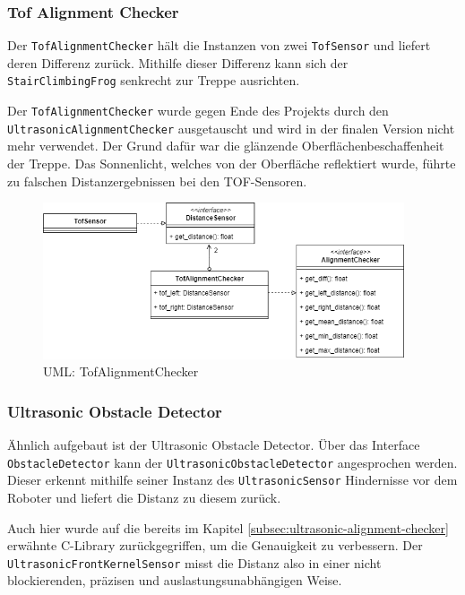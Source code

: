 \subsubsection{Tof Alignment Checker}
Der \texttt{TofAlignmentChecker} hält die Instanzen von zwei \texttt{TofSensor} und liefert deren Differenz zurück. Mithilfe dieser Differenz kann sich der \texttt{StairClimbingFrog} senkrecht zur Treppe ausrichten.

Der \texttt{TofAlignmentChecker} wurde gegen Ende des Projekts durch den \\ \texttt{UltrasonicAlignmentChecker} ausgetauscht und wird in der finalen Version nicht mehr verwendet. Der Grund dafür war die glänzende Oberflächenbeschaffenheit der Treppe. Das Sonnenlicht, welches von der Oberfläche reflektiert wurde, führte zu falschen Distanzergebnissen bei den TOF-Sensoren.

\begin{figure}[H]
  \includegraphics[width=0.95\textwidth]{img/softwarearchitektur/UML-TofAlignmentChecker.png}
  \centering
  \caption{UML: TofAlignmentChecker}
  \label{fig:uml-tof-alignment-checker}
\end{figure}

\newpage

\subsubsection{Ultrasonic Obstacle Detector}
Ähnlich aufgebaut ist der Ultrasonic Obstacle Detector. Über das Interface \texttt{ObstacleDetector} kann der \texttt{UltrasonicObstacleDetector} angesprochen werden. Dieser erkennt mithilfe seiner Instanz des \texttt{UltrasonicSensor} Hindernisse vor dem Roboter und liefert die Distanz zu diesem zurück.

Auch hier wurde auf die bereits im Kapitel \ref{subsec:ultrasonic-alignment-checker} erwähnte C-Library zurückgegriffen, um die Genauigkeit zu verbessern. Der \texttt{UltrasonicFrontKernelSensor} misst die Distanz also in einer nicht blockierenden, präzisen und auslastungsunabhängigen Weise.

